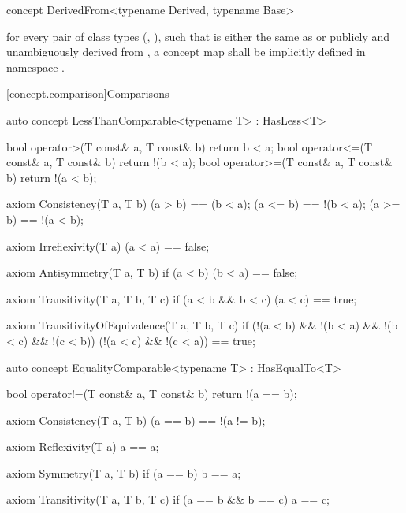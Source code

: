 \documentclass[american,twoside]{book}
\begin{document}
\begin{itemdecl}
concept DerivedFrom<typename Derived, typename Base> { }
\end{itemdecl}

\begin{itemdescr}
\pnum
\mbox{\requires}
for every pair of class types (\mbox{}, \mbox{}),
such that \mbox{} is either the same as or publicly and
unambiguously derived from \mbox{}, a concept map
\mbox{} shall be implicitly defined in namespace
\mbox{}.
\end{itemdescr}

[concept.comparison]{Comparisons}
\begin{itemdescr}
\pnum 
{}
\end{itemdescr}

\begin{itemdecl}
auto concept LessThanComparable<typename T> : HasLess<T> {
  bool operator>(T const& a, T const& b) { return b < a; }
  bool operator<=(T const& a, T const& b) { return !(b < a); }
  bool operator>=(T const& a, T const& b) { return !(a < b); }

  axiom Consistency(T a, T b) {
    (a > b) == (b < a);
    (a <= b) == !(b < a);
    (a >= b) == !(a < b);
  }

  axiom Irreflexivity(T a) { (a < a) == false; }

  axiom Antisymmetry(T a, T b) { 
    if (a < b) (b < a) == false;
  }

  axiom Transitivity(T a, T b, T c) {
    if (a < b && b < c) (a < c) == true;
  }

  axiom TransitivityOfEquivalence(T a, T b, T c) {
    if (!(a < b) && !(b < a) && !(b < c) && !(c < b))
      (!(a < c) && !(c < a)) == true;
  } 
}
\end{itemdecl}

\begin{itemdescr}
\pnum 
{}
\end{itemdescr}

\begin{itemdecl}
auto concept EqualityComparable<typename T> : HasEqualTo<T> {
  bool operator!=(T const& a, T const& b) { return !(a == b); }

  axiom Consistency(T a, T b) {
    (a == b) == !(a != b);
  }

  axiom Reflexivity(T a) { a == a; }

  axiom Symmetry(T a, T b) { if (a == b) b == a; }

  axiom Transitivity(T a, T b, T c) {
    if (a == b && b == c) a == c;
  }
}
\end{itemdecl}
\end{document}
